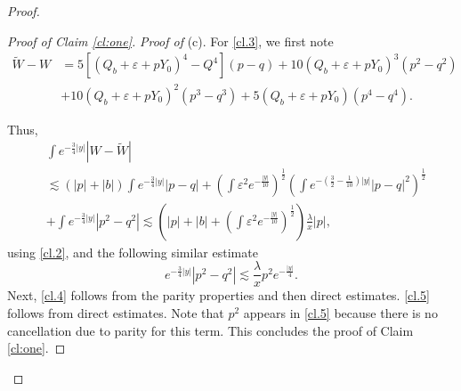 \documentclass[11pt,a4paper,reqno]{amsart}
\theoremstyle{remark}
\numberwithin{equation}{section}
\def\e{\varepsilon}
\def\l{\lambda}
\def\Yz{Y_0}
\begin{document}
\begin{proof}
\begin{proof}[Proof of Claim \ref{cl:one}]
{\it Proof of} (c). For \eqref{cl.3}, we first note
\begin{align*}
\widetilde W - W &=5\left[(Q_b+ \e+p  \Yz)^4 -   Q^4\right]  (p-q) + 10(Q_b+\e+p  \Yz)^3 (p^2-q^2) \\
&+ 10(Q_b+\e+p  \Yz)^2 (p^3-q^3) + 5(Q_b+\e+p  \Yz) (p^4-q^4).
\end{align*}

Thus, 
 \begin{align*}
&  \int e^{-\frac 34 {|y|}} |W-\widetilde W|  \\ &\lesssim
\left(  |p|+|b| \right) \int   e^{- \frac 34 {|y|}}  |p-q|
+   \left( \int \e^2 e^{-\frac {|y|}{10}} \right)^{\frac 12}\left( \int   e^{-(\frac 32-\frac 1{10}) {|y|}}  |p-q|^2\right)^{\frac 12}  \\ & + \int   e^{-\frac 34 {|y|}} |p^2-q^2|   \lesssim
\left(  |p|+|b| + \left( \int \e^2 e^{-\frac {|y|}{10}} \right)^{\frac 12}\right)  \frac {\l}{x}|p|,
\end{align*}
 using \eqref{cl.2}, and the following similar estimate
$$
e^{-\frac 34 {|y|}} |p^2-q^2| \lesssim \frac {\l}{x} p^2 e^{-\frac {|y|}{4}}.
$$
Next, \eqref{cl.4} follows from the parity properties and then direct estimates. \eqref{cl.5} follows from direct estimates. Note that   $p^2$   appears in \eqref{cl.5} because there is no cancellation due to parity for this term. This concludes the proof of Claim \ref{cl:one}.
\end{proof}


\end{proof}
\end{document}
